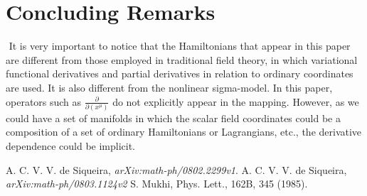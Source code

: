 \section{Concluding Remarks}
  $              $
It is very important to notice that the Hamiltonians that appear in this
paper are different from those employed in traditional field theory,
in which variational functional derivatives and partial derivatives in
relation to ordinary coordinates are used. It is also different from
the nonlinear sigma-model. In this paper, operators such as
$ \frac{\partial}{\partial(x^{\mu})}$ do not explicitly appear in the mapping. However, as we could have a set of manifolds in which
the scalar field coordinates could be a composition of a set of
ordinary Hamiltonians or Lagrangians, etc., the derivative dependence could be implicit.
\newpage
\begin{thebibliography}{99}
 A. C. V. V. de Siqueira, {\it arXiv:math-ph/0802.2299v1}.
 A. C. V. V. de Siqueira, {\it arXiv:math-ph/0803.1124v2}
 S. Mukhi, Phys. Lett., 162B, 345 (1985).
\end{thebibliography}

